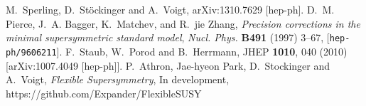 \documentclass[final,3p,times,pdflatex]{elsarticle}
\begin{document}
\begin{thebibliography}{10}
  M.~Sperling, D.~St\"ockinger and A.~Voigt,
  arXiv:1310.7629 [hep-ph].
D.~M. Pierce, J.~A. Bagger, K.~Matchev, and R.~jie Zhang, {\it Precision
  corrections in the minimal supersymmetric standard model},  {\em Nucl. Phys.}
  {\bf B491} (1997) 3--67, 
[{\tt hep-ph/9606211}].
  F.~Staub, W.~Porod and B.~Herrmann,
  JHEP {\bf 1010}, 040 (2010)
  [arXiv:1007.4049 [hep-ph]].
P.~Athron, Jae-hyeon Park, D.~Stockinger and A.~Voigt, {\it Flexible Supersymmetry}, In development, \\
https://github.com/Expander/FlexibleSUSY


















%
\end{thebibliography}
\end{document}
